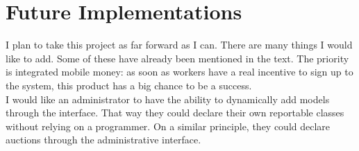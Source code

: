 \section{Future Implementations}
I plan to take this project as far forward as I can. There are many things I would like to add. Some of these have already been mentioned in the text. The priority is integrated mobile money: as soon as workers have a real incentive to sign up to the system, this product has a big chance to be a success. \\

I would like an administrator to have the ability to dynamically add models through the interface. That way they could declare their own reportable classes without relying on a programmer. On a similar principle, they could declare auctions through the administrative interface.